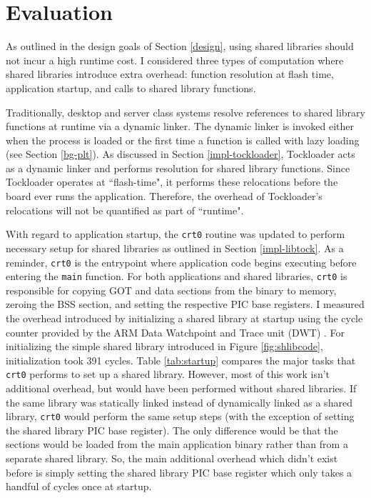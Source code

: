 \documentclass[12pt]{ucsddissertation}
\begin{document}
\chapter{Evaluation}

As outlined in the design goals of Section \ref{design}, using shared libraries should not incur a high runtime cost. I considered three types of computation where shared libraries introduce extra overhead: function resolution at flash time, application startup, and calls to shared library functions.

Traditionally, desktop and server class systems resolve references to shared library functions at runtime via a dynamic linker. The dynamic linker is invoked either when the process is loaded or the first time a function is called with lazy loading (see Section \ref{bg-plt}). As discussed in Section \ref{impl-tockloader}, Tockloader acts as a dynamic linker and performs resolution for shared library functions. Since Tockloader operates at ``flash-time", it performs these relocations before the board ever runs the application. Therefore, the overhead of Tockloader's relocations will not be quantified as part of ``runtime".

With regard to application startup, the \texttt{crt0} routine was updated to perform necessary setup for shared libraries as outlined in Section \ref{impl-libtock}. As a reminder, \texttt{crt0} is the entrypoint where application code begins executing before entering the \texttt{main} function. For both applications and shared libraries, \texttt{crt0} is responsible for copying GOT and data sections from the binary to memory, zeroing the BSS section, and setting the respective PIC base registers. I measured the overhead introduced by initializing a shared library at startup using the cycle counter provided by the ARM Data Watchpoint and Trace unit (DWT) \cite{arm-dwt}. For initializing the simple shared library introduced in Figure \ref{fig:shlibcode}, initialization took 391 cycles. Table \ref{tab:startup} compares the major tasks that \texttt{crt0} performs to set up a shared library. However, most of this work isn't additional overhead, but would have been performed without shared libraries. If the same library was statically linked instead of dynamically linked as a shared library, \texttt{crt0} would perform the same setup steps (with the exception of setting the shared library PIC base register). The only difference would be that the sections would be loaded from the main application binary rather than from a separate shared library. So, the main additional overhead which didn't exist before is simply setting the shared library PIC base register which only takes a handful of cycles once at startup. 
\end{document}

